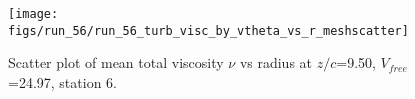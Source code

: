 \begin{figure}[H]
\centering
\texttt{[image: figs/run\_56/run\_56\_turb\_visc\_by\_vtheta\_vs\_r\_meshscatter]}
\caption{Scatter plot of mean total viscosity $\nu$ vs radius at $z/c$=9.50, $V_{free}$=24.97, station 6.}
\label{fig:run_56_turb_visc_by_vtheta_vs_r_meshscatter}
\end{figure}


